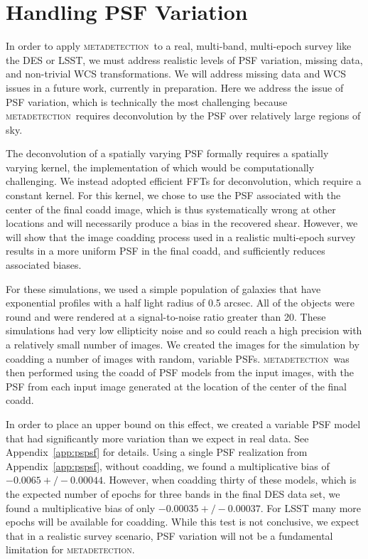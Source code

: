 \documentclass[iop, twocolappendix, appendixfloats, numberedappendix, apj]{hackemulateapj}
\newcommand{\mdet}{\textsc{metadetection}}
\begin{document}
\section{Handling PSF Variation}
\label{sec:psfvar}

In order to apply \mdet\ to a real, multi-band, multi-epoch survey like the DES
or LSST, we must address realistic levels of PSF variation, missing data, and
non-trivial WCS transformations. We will address missing data and WCS issues in
a future work, currently in preparation. Here we address the issue of PSF
variation, which is technically the most challenging because \mdet\ requires
deconvolution by the PSF over relatively large regions of sky.

The deconvolution of a spatially varying PSF formally requires a spatially
varying kernel, the implementation of which would be computationally
challenging.  We instead adopted efficient FFTs for deconvolution, which require
a constant kernel.  For this kernel, we chose to use the PSF associated with
the center of the final coadd image, which is thus systematically wrong at
other locations and will necessarily produce a bias in the recovered shear.
However, we will show that the image coadding process used in a realistic
multi-epoch survey results in a more uniform PSF in the final coadd, and
sufficiently reduces associated biases.

For these simulations, we used a simple population of galaxies that have
exponential profiles with a half light radius of 0.5 arcsec. All of the objects
were round and were rendered at a signal-to-noise ratio greater than 20. These
simulations had very low ellipticity noise and so could reach a high precision
with a relatively small number of images. We created the images for the
simulation by coadding a number of images with random, variable PSFs.  \mdet\
was then performed using the coadd of PSF models from the input images, with
the PSF from each input image generated at the location of the center of the
final coadd.

In order to place an upper bound on this effect, we created a variable PSF
model that had significantly more variation than we expect in real data. See
Appendix~\ref{app:pspsf} for details.  Using a single PSF realization from
Appendix~\ref{app:pspsf}, without coadding, we found a multiplicative bias of
$-0.0065 +/- 0.00044$.  However, when coadding thirty of these models, which is
the expected number of epochs for three bands in the final DES data set, we
found a multiplicative bias of only $-0.00035 +/- 0.00037$.  For LSST many more
epochs will be available for coadding.   While this test is not conclusive, we
expect that in a realistic survey scenario, PSF variation will not be a
fundamental limitation for \mdet.
\end{document}
